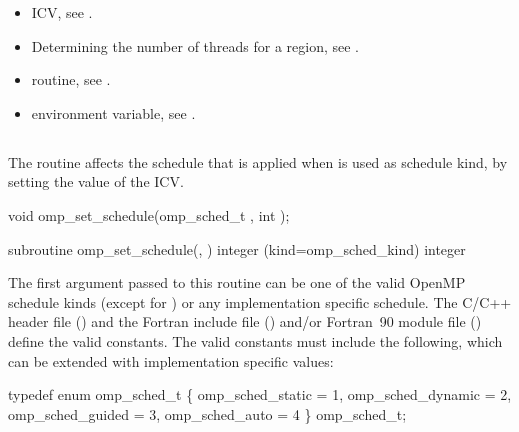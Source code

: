\crossreferences
\begin{itemize}
\item {} ICV, see 
.

\item Determining the number of threads for a  region, see
. 

\item {} routine, see 
.

\item {} environment variable, see 
.
\end{itemize}









\subsection{}
\label{subsec:omp_set_schedule}
\summary
The  routine affects the schedule that is applied when  
is used as schedule kind, by setting the value of the  ICV. 

\format
\ccppspecificstart
\begin{boxedcode}
void omp\_set\_schedule(omp\_sched\_t , int );
\end{boxedcode}
\ccppspecificend

\fortranspecificstart
\begin{boxedcode}
subroutine omp\_set\_schedule(, ) 
integer (kind=omp\_sched\_kind) 
integer 
\end{boxedcode}
\fortranspecificend

\constraints
The first argument passed to this routine can be one of the valid OpenMP schedule kinds 
(except for ) or any implementation specific schedule. The C/C++ header file 
() and the Fortran include file () and/or Fortran~90 module file 
() define the valid constants. The valid constants must include the following, 
which can be extended with implementation specific values:

\pagebreak
\ccppspecificstart
\begin{boxedcode}
typedef enum omp\_sched\_t \{
    omp\_sched\_static = 1,
    omp\_sched\_dynamic = 2,
    omp\_sched\_guided = 3,
    omp\_sched\_auto = 4
\} omp\_sched\_t;
\end{boxedcode}
\ccppspecificend

